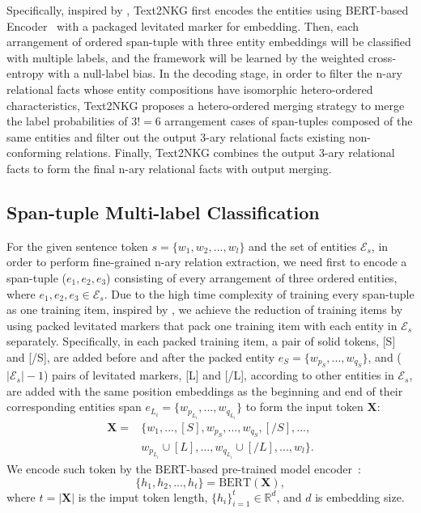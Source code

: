 \documentclass{article} \usepackage{iclr2024_conference,times}
\begin{document}
Specifically, inspired by \cite{PL-Marker}, Text2NKG first encodes the entities using BERT-based Encoder~\citep{Bert} with a packaged levitated marker for embedding. Then, each arrangement of ordered span-tuple with three entity embeddings will be classified with multiple labels, and the framework will be learned by the weighted cross-entropy with a null-label bias. In the decoding stage, in order to filter the n-ary relational facts whose entity compositions have isomorphic hetero-ordered characteristics, Text2NKG proposes a hetero-ordered merging strategy to merge the label probabilities of $3!=6$ arrangement cases of span-tuples composed of the same entities and filter out the output 3-ary relational facts existing non-conforming relations. Finally, Text2NKG combines the output 3-ary relational facts to form the final n-ary relational facts with output merging.

\subsection{Span-tuple Multi-label Classification}

 

For the given sentence token $s=\{w_1,w_2,...,w_l\}$ and the set of entities $\mathcal{E}_s$, in order to perform fine-grained n-ary relation extraction, we need first to encode a span-tuple ($e_1,e_2,e_3$) consisting of every arrangement of three ordered entities, where $e_1,e_2,e_3\in \mathcal{E}_s$. Due to the high time complexity of training every span-tuple as one training item, inspired by \cite{PL-Marker}, we achieve the reduction of training items by using packed levitated markers that pack one training item with each entity in $\mathcal{E}_s$ separately. Specifically, in each packed training item, a pair of solid tokens, [S] and [/S], are added before and after the packed entity $e_S=\{w_{p_S},...,w_{q_S}\}$, and ($|\mathcal{E}_s|-1$) pairs of levitated markers, [L] and [/L], according to other entities in $\mathcal{E}_s$, are added with the same position embeddings as the beginning and end of their corresponding entities span $e_{L_i}=\{w_{p_{L_i}},...,w_{q_{L_i}}\}$ to form the input token $\mathbf{X}$:
\begin{equation}
\begin{aligned}
\mathbf{X}=&\{w_1,...,[S],w_{p_S},...,w_{q_S},[/S],...,\\&w_{p_{L_i}}\cup[L],...,w_{q_{L_i}}\cup[/L],...,w_l\}.
\end{aligned}
\end{equation}
We encode such token by the BERT-based pre-trained model encoder~\citep{Bert}:
\begin{equation}
\{h_1,h_2,...,h_t\}=\text{BERT}(\mathbf{X}),
\end{equation}
where $t=|\mathbf{X}|$ is the imput token length, $\{h_i\}_{i=1}^t \in \mathbb{R}^d$, and $d$ is embedding size.
\end{document}
